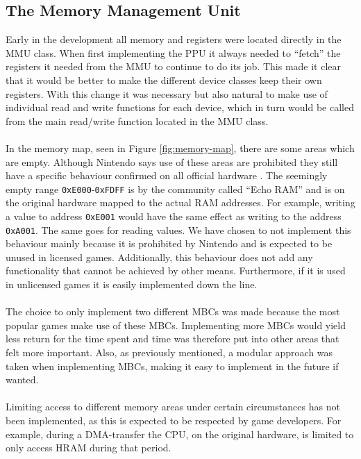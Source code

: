 \subsection{The Memory Management Unit}
Early in the development all memory and registers were located directly in the MMU class. 
When first implementing the PPU it always needed to ``fetch'' the registers it needed from the MMU to continue to do its job.
This made it clear that it would be better to make the different device classes keep their own registers.
With this change it was necessary but also natural to make use of individual read and write functions for each device, which in turn would be called from the main read/write function located in the MMU class.
\\\\
In the memory map, seen in Figure \ref{fig:memory-map}, there are some areas which are empty.
Although Nintendo says use of these areas are prohibited they still have a specific behaviour confirmed on all official hardware \cite{pandocsechoram}.
The seemingly empty range \texttt{0xE000}-\texttt{0xFDFF} is by the community called ``Echo RAM'' and is on the original hardware mapped to the actual RAM addresses.
For example, writing a value to address \texttt{0xE001} would have the same effect as writing to the address \texttt{0xA001}. The same goes for reading values.
We have chosen to not implement this behaviour mainly because it is prohibited by Nintendo and is expected to be unused in licensed games. 
Additionally, this behaviour does not add any functionality that cannot be achieved by other means.
Furthermore, if it is used in unlicensed games it is easily implemented down the line.  
\\\\
The choice to only implement two different MBCs was made because the most popular games make use of these MBCs. 
Implementing more MBCs would yield less return for the time spent and time was therefore put into other areas that felt more important. Also, as previously mentioned, a modular approach was taken when implementing MBCs, making it easy to implement in the future if wanted.
\\\\
Limiting access to different memory areas under certain circumstances has not been implemented, as this is expected to be respected by game developers. For example, during a DMA-transfer the CPU, on the original hardware, is limited to only access HRAM during that period.

